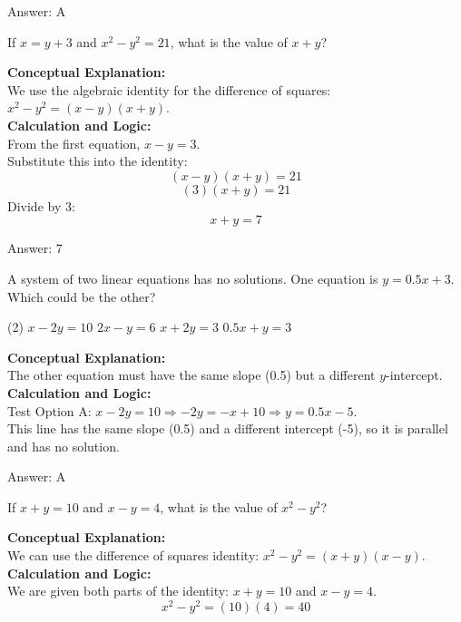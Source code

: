 \documentclass[11pt,paper=a4,answers]{exam}
\begin{document}
\begin{questions}
\begin{solution}
\vspace{15pt}
Answer: \colorbox{yellow!100}{A}
\end{solution}

\question
If $x = y + 3$ and $x^2 - y^2 = 21$, what is the value of $x + y$?

\begin{solution}
\textbf{Conceptual Explanation:} \\
We use the algebraic identity for the difference of squares: $x^2 - y^2 = (x - y)(x + y)$.
\\[10pt]
\textbf{Calculation and Logic:} \\
From the first equation, $x - y = 3$. \\
Substitute this into the identity:
\[(x - y)(x + y) = 21\]
\[(3)(x + y) = 21\]
Divide by 3:
\[x + y = 7\]

\vspace{15pt}
Answer: \colorbox{yellow!100}{7}
\end{solution}

\question
A system of two linear equations has no solutions. One equation is $y = 0.5x + 3$. Which could be the other?
\begin{tasks}(2)
    \task $x - 2y = 10$
    \task $2x - y = 6$
    \task $x + 2y = 3$
    \task $0.5x + y = 3$
\end{tasks}

\begin{solution}
\textbf{Conceptual Explanation:} \\
The other equation must have the same slope (0.5) but a different $y$-intercept.
\\[10pt]
\textbf{Calculation and Logic:} \\
Test Option A: $x - 2y = 10 \Rightarrow -2y = -x + 10 \Rightarrow y = 0.5x - 5$. \\
This line has the same slope (0.5) and a different intercept (-5), so it is parallel and has no solution.

\vspace{15pt}
Answer: \colorbox{yellow!100}{A}
\end{solution}

\question
If $x + y = 10$ and $x - y = 4$, what is the value of $x^2 - y^2$?

\begin{solution}
\textbf{Conceptual Explanation:} \\
We can use the difference of squares identity: $x^2 - y^2 = (x + y)(x - y)$.
\\[10pt]
\textbf{Calculation and Logic:} \\
We are given both parts of the identity: $x + y = 10$ and $x - y = 4$.
\[x^2 - y^2 = (10)(4) = 40\]


\end{solution}
\end{questions}
\end{document}

